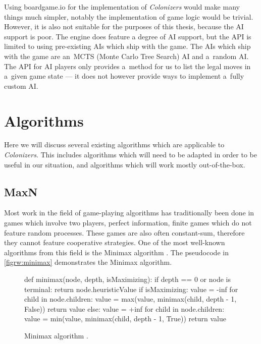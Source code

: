 Using boardgame.io for the implementation of \emph{Colonizers} would make many things
much simpler, notably the implementation of game logic would be trivial.
However, it is also not suitable for the purposes of this thesis, because the AI
support is poor. The engine does feature a degree of AI support, but the API
is limited to using pre-existing AIs which ship with the game. The AIs which
ship with the game are an~MCTS (Monte Carlo Tree Search) AI and
a~random AI. The API for AI players only provides a~method for us to list the legal moves in
a~given game state --- it does not however provide ways to implement a~fully
custom AI.

\clearpage
\section{Algorithms}

Here we will discuss several existing algorithms which are applicable to \emph{Colonizers}.
This includes algorithms which will need to be adapted in order to be useful in our
situation, and algorithms which will work mostly out-of-the-box.

\subsection{MaxN}
\label{rw:maxn}

Most work in the field of game-playing algorithms has traditionally been done
in games which involve two players, perfect information, finite games which
do not feature random processes. These games are also often constant-sum, therefore
they cannot feature cooperative strategies. One of the most well-known
algorithms from this field is the Minimax algorithm \cite{Millington09}. The pseudocode
in \autoref{figrw:minimax} demonstrates the Minimax algorithm.

\begin{figure}[h!]
\begin{code}
def minimax(node, depth, isMaximizing):
    if depth == 0 or node is terminal:
        return node.heuristicValue
    if isMaximizing:
        value = -inf
        for child in node.children:
            value = max(value, minimax(child, depth - 1, False))
        return value
    else:
        value = +inf
        for child in node.children:
            value = min(value, minimax(child, depth - 1, True))
        return value
\end{code}
\caption{Minimax algorithm \cite{Millington09}.}\label{figrw:minimax}
\end{figure}

